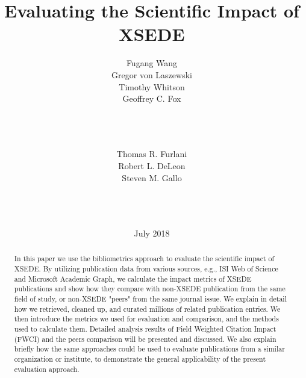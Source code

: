 \documentclass{sig-alternate}
\newcommand{\TITLE}{Evaluating the Scientific Impact of XSEDE}
\begin{document}

\title{\TITLE\vspace{-12pt}}

\author{ 
\alignauthor 
Fugang Wang\\ \vspace{2pt}
Gregor von Laszewski\\ \vspace{2pt}
Timothy Whitson\\ \vspace{2pt}
Geoffrey C. Fox\\ \vspace{6pt}
       \\ 
       \\ 
       \\ 
\and
\alignauthor  
Thomas R. Furlani\\ \vspace{2pt}
Robert L. DeLeon\\ \vspace{2pt}
Steven M. Gallo\\ \vspace{6pt}
       \\
       \\ 
       \\ 
}

\date{July 2018}

\maketitle

\begin{abstract}

  In this paper we use the bibliometrics approach to evaluate the
  scientific impact of XSEDE.  By utilizing publication data from
  various sources, e.g., ISI Web of Science and Microsoft Academic
  Graph, we calculate the impact metrics of XSEDE publications and
  show how they compare with non-XSEDE publication from the same field
  of study, or non-XSEDE "peers" from the same journal issue. We
  explain in detail how we retrieved, cleaned up, and curated millions
  of related publication entries.  We then introduce the metrics we
  used for evaluation and comparison, and the methods used to
  calculate them. Detailed analysis results of Field Weighted Citation
  Impact (FWCI) and the peers comparison will be presented and
  discussed. We also explain briefly how the same approaches could be
  used to evaluate publications from a similar organization or
  institute, to demonstrate the general applicability of the present
  evaluation approach.


\end{abstract}
\end{document}
